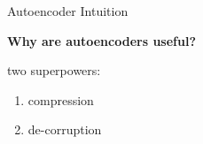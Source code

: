 \begin{frame}{Autoencoder Intuition}

{\Large
\textbf{Why are autoencoders useful?}
}

\pause

\vspace{4ex}

{\Large
two superpowers:

\pause

\begin{enumerate}

\item compression 

\pause

\item de-corruption 

\end{enumerate}
}

\end{frame}


